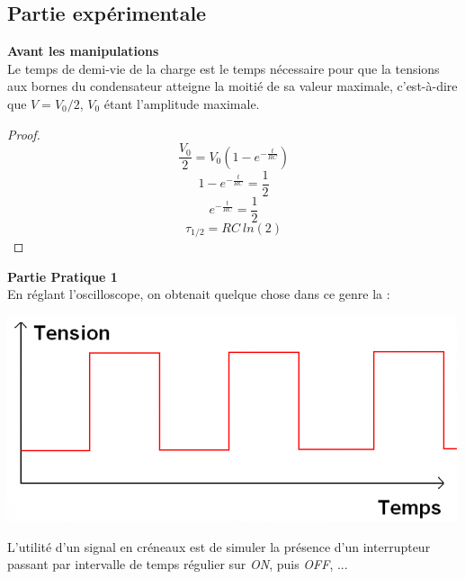 \documentclass	[11pt, a4paper, openany]{book}
\begin{document}
		\newpage
		\subsection{Partie expérimentale}
		\textbf{Avant les manipulations}\\
		Le temps de demi-vie de la charge est le temps nécessaire pour que la tensions aux bornes du condensateur atteigne la moitié de sa valeur maximale, c'est-à-dire que $V = V_0/2$, $V_0$ étant l'amplitude maximale.
		\begin{proof}
			\begin{equation}
				\frac{V_0}{2} = V_0 \left(1-e^{-\frac{t}{RC}}\right)
			\end{equation}
			\begin{equation}
				1 - e^{-\frac{t}{RC}} = \frac{1}{2}
			\end{equation}
			\begin{equation}
				e^{-\frac{t}{RC}} = \frac{1}{2}
			\end{equation}
			\begin{equation}
				\tau_{1/2} = RC\ ln(2)
			\end{equation}
		\end{proof}
		
		\textbf{Partie Pratique 1}\\
		En réglant l'oscilloscope, on obtenait quelque chose dans ce genre la :
		\begin{center}
			\includegraphics[scale=0.5]{labo/image17.png}
		\end{center}
		L'utilité d'un signal en créneaux est de simuler la présence d'un interrupteur passant par intervalle de temps régulier sur \textit{ON}, puis \textit{OFF}, ... \\
		
\end{document}
